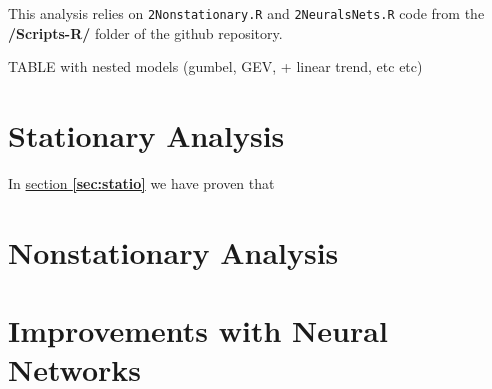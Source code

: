 
This analysis relies on \texttt{2Nonstationary.R} and \texttt{2NeuralsNets.R} code from the \textbf{/Scripts-R/} folder of the github repository.

TABLE with nested models (gumbel, GEV, + linear trend, etc etc)


\section{Stationary Analysis}


In \hyperref[sec:statio]{section \textbf{\ref{sec:statio}}} we have proven that 

\section{Nonstationary Analysis}

\section{Improvements with Neural Networks}